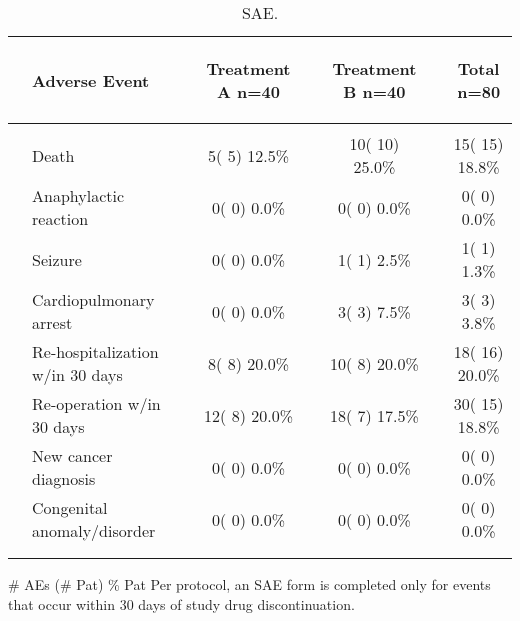 \documentclass[dvips,10pt]{article}
\begin{document}
\begin{table}[t]
\caption
{ SAE. }
\begin{center}
\begin{tabular}{ @{}l@{}
@{}l@{}@{}p{1.5em}@{}@{}c@{}@{}p{1.5em}@{}@{}c@{}@{}p{1.5em}@{}@{}c@{}
}
\hline

& \parbox{6em}{\begin{center}Adverse Event\end{center}} && \parbox{6em}{\begin{center}Treatment A n=40\end{center}} && \parbox{6em}{\begin{center}Treatment B n=40\end{center}} && \parbox{6em}{\begin{center}Total n=80\end{center}} \\

\hline

\\
& Death && 5(  5) 12.5\% && 10( 10) 25.0\% && 15( 15) 18.8\% \\
& Anaphylactic reaction && 0(  0)  0.0\% && 0(  0)  0.0\% && 0(  0)  0.0\% \\
& Seizure && 0(  0)  0.0\% && 1(  1)  2.5\% && 1(  1)  1.3\% \\
& Cardiopulmonary arrest && 0(  0)  0.0\% && 3(  3)  7.5\% && 3(  3)  3.8\% \\
& Re-hospitalization w/in 30 days && 8(  8) 20.0\% && 10(  8) 20.0\% && 18( 16) 20.0\% \\
& Re-operation w/in 30 days && 12(  8) 20.0\% && 18(  7) 17.5\% && 30( 15) 18.8\% \\
& New cancer diagnosis && 0(  0)  0.0\% && 0(  0)  0.0\% && 0(  0)  0.0\% \\
& Congenital anomaly/disorder && 0(  0)  0.0\% && 0(  0)  0.0\% && 0(  0)  0.0\% \\
\\
\hline \\

\end{tabular}


\parbox{ 5in }{ \# AEs (\# Pat) \% Pat \newline Per protocol, an SAE form is completed only for events that occur within 30
  days of study drug discontinuation. } \\
 \vspace{1em}\end{center}
 \end{table}
\end{document}
